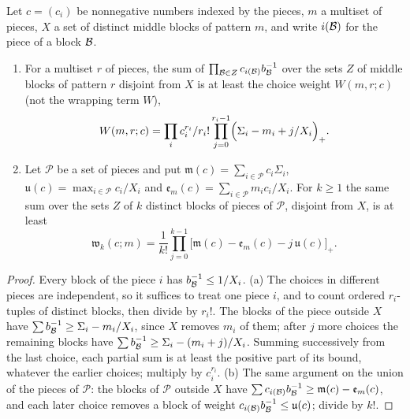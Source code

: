 \begin{lemma}\label{lem:distinct-choice}
Let $c=(c_i)$ be nonnegative numbers indexed by the pieces, $m$ a multiset of
pieces, $X$ a set of distinct middle blocks of pattern $m$, and write $i(\Blk)$
for the piece of a block $\Blk$.
\begin{enumerate}[label=(\alph*)]
\item For a multiset $r$ of pieces, the sum of
 $\prod_{\Blk\in Z}c_{i(\Blk)}b_\Blk^{-1}$ over the sets $Z$ of middle blocks of
 pattern $r$ disjoint from $X$ is at least the choice weight $W(m,r;c)$ (not the wrapping term $W$),
 \begin{equation}\label{eq:variance:choice-weight}
  W(m,r;c)=\prod_i\frac{c_i^{r_i}}{r_i!}\prod_{j=0}^{r_i-1}
  \Bigl(\Sigma_i-\frac{m_i+j}{X_i}\Bigr)_+ .
 \end{equation}
\item Let $\mathcal P$ be a set of pieces and put
 $\mathfrak m(c)=\sum_{i\in\mathcal P}c_i\Sigma_i$,
 $\mathfrak u(c)=\max_{i\in\mathcal P}c_i/X_i$ and
 $\mathfrak e_m(c)=\sum_{i\in\mathcal P}m_ic_i/X_i$. For $k\ge1$ the same sum over
 the sets $Z$ of $k$ distinct blocks of pieces of $\mathcal P$, disjoint from $X$,
 is at least
 \[
  \mathfrak w_k(c;m)=\frac1{k!}\prod_{j=0}^{k-1}
  \bigl[\mathfrak m(c)-\mathfrak e_m(c)-j\,\mathfrak u(c)\bigr]_+ .
 \]
\end{enumerate}
\end{lemma}

\begin{proof}
Every block of the piece $i$ has $b_\Blk^{-1}\le1/X_i$. (a) The choices in
different pieces are independent, so it suffices to treat one piece $i$, and to
count ordered $r_i$-tuples of distinct blocks, then divide by $r_i!$. The
blocks of the piece outside $X$ have $\sum b_\Blk^{-1}\ge\Sigma_i-m_i/X_i$, since
$X$ removes $m_i$ of them; after $j$ more choices the remaining blocks have
$\sum b_\Blk^{-1}\ge\Sigma_i-(m_i+j)/X_i$. Summing successively from the last
choice, each partial sum is at least the positive part of its bound, whatever
the earlier choices; multiply by $c_i^{r_i}$. (b) The same argument on the
union of the pieces of $\mathcal P$: the blocks of $\mathcal P$ outside $X$ have
$\sum c_{i(\Blk)}b_\Blk^{-1}\ge\mathfrak m(c)-\mathfrak e_m(c)$, and each later
choice removes a block of weight $c_{i(\Blk)}b_\Blk^{-1}\le\mathfrak u(c)$;
divide by $k!$.
\end{proof}

